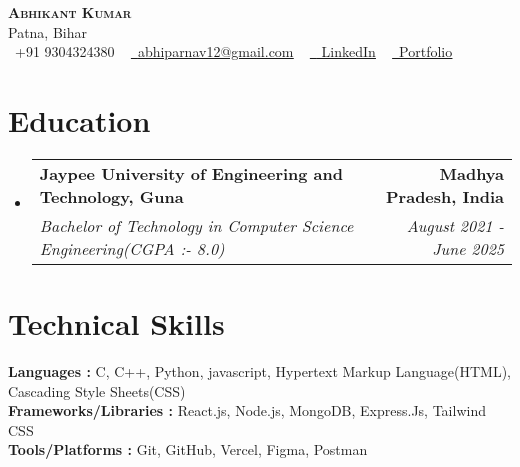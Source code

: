 \documentclass[letterpaper,11pt]{article}
\makeatletter
\newcommand{\resumeSubheading}[4]{
  \vspace{-2pt}\item
	\begin{tabular*}{1.0\textwidth}[t]{l@{\extracolsep{\fill}}r}
  	\textbf{#1} & \textbf{\small #2} \\
  	\textit{\small#3} & \textit{\small #4} \\
	\end{tabular*}\vspace{-7pt}
}
\newcommand{\resumeSubHeadingListStart}{\begin{itemize}[leftmargin=0.0in, label={}]}
\newcommand{\resumeSubHeadingListEnd}{\end{itemize}}
\makeatother
\begin{document}
 

\begin{center}
	{\Huge  {\scshape \textbf{Abhikant Kumar}}} \\ \vspace{3pt}
	Patna, Bihar  \\ \vspace{2pt}
	\small \raisebox{-0.1\height}\faPhone\ +91 9304324380 ~ \href{mailto:x@gmail.com}{\raisebox{-0.2\height}\faEnvelope\  \underline{abhiparnav12@gmail.com}} ~
	\href{https://linkedin.com/in//}{\raisebox{-0.2\height}\faLinkedin\ \underline{ LinkedIn}} ~
   \href{https://abhikant-portfolio.netlify.app/}{\raisebox{-0.2\height}\faGlobe\ \underline{Portfolio}}
\end{center}


\section{Education}
  \resumeSubHeadingListStart
	\resumeSubheading
  	{Jaypee University of Engineering and Technology, Guna}{Madhya Pradesh, India}
  	{Bachelor of Technology in Computer Science Engineering(CGPA  :-  8.0)}{August 2021 - June 2025}
   \vspace{1pt}
  \resumeSubHeadingListEnd

  
 
\section{Technical Skills }
 \begin{itemize}[leftmargin=0.15in, label={}]
	\small{\item{
 	\textbf{Languages : }{ C, C++, Python, javascript, Hypertext Markup Language(HTML), Cascading Style Sheets(CSS) } \\  \vspace{4pt}
        \textbf{Frameworks/Libraries :}  {React.js, Node.js, MongoDB, Express.Js, Tailwind CSS } \\  \vspace{4pt}
        \textbf{Tools/Platforms :}  {Git, GitHub, Vercel, Figma, Postman} \\
	}}
 \end{itemize}
 \vspace{-11pt}



\end{document}

